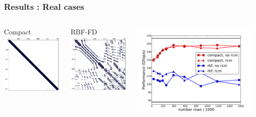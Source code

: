 \documentclass{beamer}
\begin{document}
\begin{frame}
  \frametitle{Results : Real cases}
  \begin{columns}
    \begin{block}{Compact}
      \centering
      \includegraphics[width=.6\linewidth]{slides-figures/ICS-figures/compact_matrix-crop.png}
    \end{block}
  
    \begin{block}{RBF-FD}
      \centering
      \includegraphics[width=.6\linewidth]{slides-figures/ICS-figures/kd-tree-3d-norcm-crop.png}
    \end{block}
    
    \includegraphics[width=\linewidth]{slides-figures/ICS-figures/rbf_compact.pdf}
  \end{columns}
\end{frame}
\end{document}
